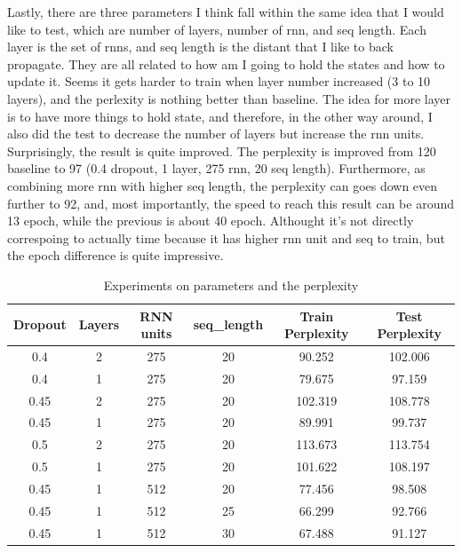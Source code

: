 \documentclass{article}
\begin{document}
Lastly, there are three parameters I think fall within the same idea that I would like to test, which are number of layers, number of rnn, and seq length. Each layer is the set of rnns, and seq length is the distant that I like to back propagate. They are all related to how am I going to hold the states and how to update it. Seems it gets harder to train when layer number increased (3 to 10 layers), and the perlexity is nothing better than baseline. The idea for more layer is to have more things to hold state, and therefore, in the other way around, I also did the test to decrease the number of layers but increase the rnn units. Surprisingly, the result is quite improved. The perplexity is improved from 120 baseline to 97 (0.4 dropout, 1 layer, 275 rnn, 20 seq length). Furthermore, as combining more rnn with higher seq length, the perplexity can goes down even further to 92, and, most importantly, the speed to reach this result can be around 13 epoch, while the previous is about 40 epoch. Althought it's not directly correspoing to actually time because it has higher rnn unit and seq to train, but the epoch difference is quite impressive.

\begin{table}[h]
\begin{center}
    \begin{tabular}{| c | c | c | c | c | c |}
    \hline
    Dropout & Layers & RNN units & seq\_length & Train Perplexity & Test Perplexity\\ \hline
    0.4 & 2 & 275 & 20 & 90.252 & 102.006 \\ \hline
    0.4 & 1 & 275 & 20 & 79.675 & 97.159 \\ \hline
    0.45 & 2 & 275 & 20 & 102.319 & 108.778 \\ \hline
    0.45 & 1 & 275 & 20 & 89.991 & 99.737 \\ \hline
    0.5 & 2 & 275 & 20 & 113.673 & 113.754 \\ \hline
    0.5 & 1 & 275 & 20 & 101.622 & 108.197 \\ \hline
    0.45 & 1 & 512 & 20 & 77.456 & 98.508 \\ \hline
    0.45 & 1 & 512 & 25 & 66.299 & 92.766 \\ \hline
    0.45 & 1 & 512 & 30 & 67.488 & 91.127 \\ \hline
    \end{tabular}
\end{center}
\caption{Experiments on parameters and the perplexity}
\end{table}
\end{document}
